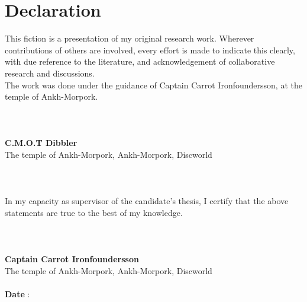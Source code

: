 \chapter[Declaration]{\centering Declaration}
This fiction is a presentation of my original research work. Wherever contributions of others are involved, every effort is made to indicate this clearly, with due reference to the literature, and acknowledgement of collaborative research and discussions. 
\\
The work was done under the guidance of Captain Carrot Ironfoundersson, at the temple of Ankh-Morpork.
\\\\\\\\
\null\hfill \textbf{ C.M.O.T Dibbler}\\
\null\hfill The temple of Ankh-Morpork, Ankh-Morpork, Discworld
\\\\\\\\
In my capacity as supervisor of the candidate’s thesis, I certify that the above statements are true to the best of my knowledge.
\\\\\\\\
\null\hfill \textbf{Captain Carrot Ironfoundersson}\\
\null\hfill  The temple of Ankh-Morpork, Ankh-Morpork, Discworld\\
\\
\null\hfill \textbf{Date} : \qquad\qquad\qquad\qquad\qquad\\